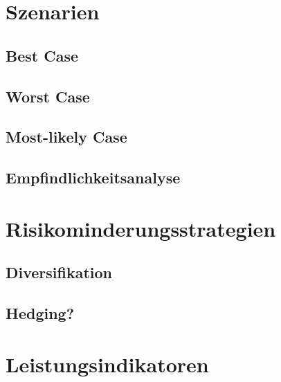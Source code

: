     \section{Szenarien}

        \subsection{Best Case}

        \subsection{Worst Case}

        \subsection{Most-likely Case}

        \subsection{Empfindlichkeitsanalyse}

    \section{Risikominderungsstrategien}

        \subsection{Diversifikation}

        \subsection{Hedging?}

    \section{Leistungsindikatoren}
